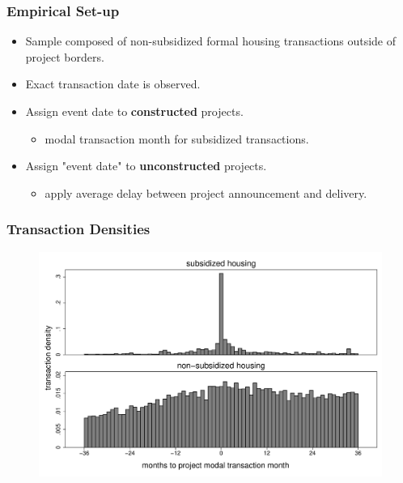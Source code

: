 \documentclass[aspectratio=32]{beamer}
\begin{document}
\begin{frame}
\frametitle{Empirical Set-up}
\vspace{-1.5mm}
\begin{itemize}
\item Sample composed of non-subsidized formal housing transactions outside of project borders. 
\vspace{.5em}
\item Exact transaction date is observed.
\vspace{.5em}
\item Assign event date to {\bf constructed} projects.
\begin{itemize}
  \item modal transaction month for subsidized transactions.
\end{itemize}
\vspace{.5em}
\item Assign "event date" to {\bf unconstructed} projects.
\begin{itemize}
  \item apply average delay between project announcement and delivery.
\end{itemize}
\end{itemize}
\end{frame}


\begin{frame}
\frametitle{Transaction Densities}
\begin{center}
\begin{figure}
\includegraphics[scale=0.32]{figures/summary_densitytime.pdf}
\vspace{-3mm}
\end{figure}
\end{center}
\end{frame}
\end{document}
